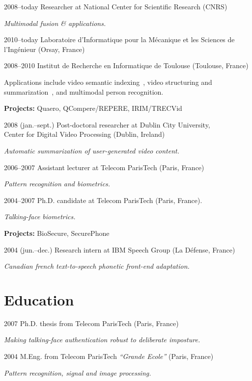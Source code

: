 \documentclass{simplecv}
\begin{document}
\begin{topic}
\item[2008--today] Researcher at National Center for Scientific Research (CNRS)

\emph{Multimodal fusion \& applications.} 

\begin{topic}
	\item[2010--today] Laboratoire d'Informatique pour la M\'{e}canique et les Sciences de l'Ing\'{e}nieur (Orsay, France)
	\item[2008--2010] Institut de Recherche en Informatique de Toulouse (Toulouse, France)
\end{topic}

Applications include video semantic indexing~\cite{Bredin2012a}, video structuring and summarization~\cite{Bredin2012}, and multimodal person recognition.

\textbf{Projects:} Quaero, QCompere/REPERE, IRIM/TRECVid

\item[2008 (jan.--sept.)] Post-doctoral researcher at Dublin City University,\\ Center for Digital Video Processing (Dublin, Ireland)

\emph{Automatic summarization of user-generated video content.}

\item[2006--2007] Assistant lecturer at Telecom ParisTech (Paris, France)

\emph{Pattern recognition and biometrics.}

\item[2004--2007] Ph.D. candidate at Telecom ParisTech (Paris, France).

\emph{Talking-face biometrics.}

\textbf{Projects:} BioSecure, SecurePhone 

\item[2004 (jun.--dec.)] Research intern at IBM Speech Group (La D\'{e}fense, France)

\emph{Canadian french text-to-speech phonetic front-end adaptation.}
\end{topic}

\section{Education}

\begin{topic}
\item[2007] Ph.D. thesis from Telecom ParisTech (Paris, France)

\emph{Making talking-face authentication robust to deliberate imposture.}

\item[2004] M.Eng. from Telecom ParisTech \emph{``Grande Ecole''} (Paris, France)

\emph{Pattern recognition, signal and image processing.}
\end{topic}
\end{document}
